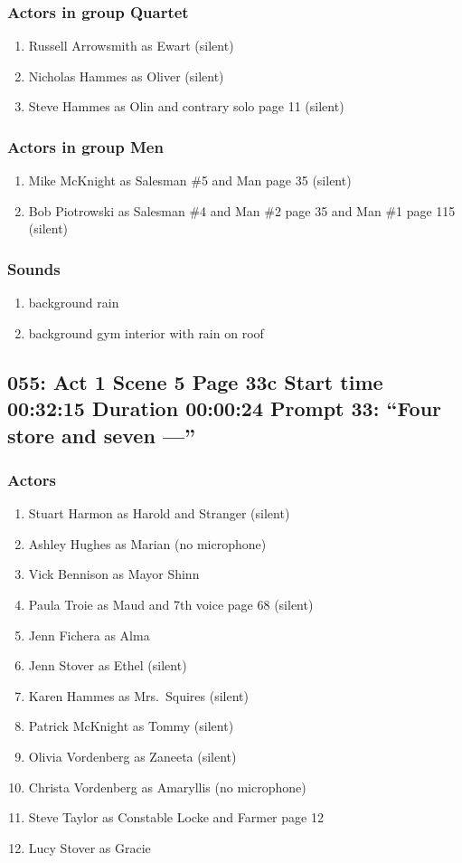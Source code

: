 \subsubsection{Actors in group Quartet}
\begin{enumerate}
\item Russell Arrowsmith as Ewart (silent)
\item Nicholas Hammes as Oliver (silent)
\item Steve Hammes as Olin and contrary solo page 11 (silent)
\end{enumerate}
\subsubsection{Actors in group Men}
\begin{enumerate}
\item Mike McKnight as Salesman \#5 and Man page 35 (silent)
\item Bob Piotrowski as Salesman \#4 and Man \#2 page 35 and Man \#1 page 115 (silent)
\end{enumerate}

\subsubsection{Sounds}
\begin{enumerate}
\item background rain
\item background gym interior with rain on roof
\end{enumerate}
\subsection{055: Act 1 Scene 5 Page 33c Start time 00:32:15 Duration 00:00:24 Prompt 33: ``Four store and seven ---''}

\subsubsection{Actors}
\begin{enumerate}
\item Stuart Harmon as Harold and Stranger (silent)
\item Ashley Hughes as Marian (no microphone)
\item Vick Bennison as Mayor Shinn
\item Paula Troie as Maud and 7th voice page 68 (silent)
\item Jenn Fichera as Alma
\item Jenn Stover as Ethel (silent)
\item Karen Hammes as Mrs.~Squires (silent)
\item Patrick McKnight as Tommy (silent)
\item Olivia Vordenberg as Zaneeta (silent)
\item Christa Vordenberg as Amaryllis (no microphone)
\item Steve Taylor as Constable Locke and Farmer page 12
\item Lucy Stover as Gracie
\end{enumerate}
